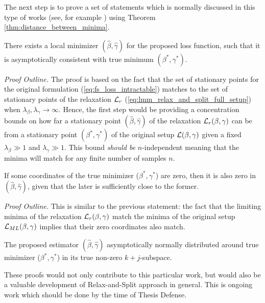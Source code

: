 \documentclass[11pt,letterpaper]{article}
\numberwithin{equation}{section} %
\numberwithin{figure}{section} %
\numberwithin{table}{section} %
\begin{document}
The next step is to prove a set of statements which is normally discussed in this type of works (see, for example \cite{Krishna2008, Hui2017}) using Theorem \ref{thm:distance_between_minima}.

\begin{theorem}
	There exists a local minimizer $(\hat{\beta}, \hat{\gamma})$ for the proposed loss function, such that it is asymptotically consistent with true minimum $(\beta^*, \gamma^*)$. 
\end{theorem}
\textit{Proof Outline.} The proof is based on the fact that the set of stationary points for the original formulation (\ref{eq:fs_loss_intractable}) matches to the set of stationary points of the relaxation $\operatorname{\mathcal{L}}_r$ (\ref{eq:lmm_relax_and_split_full_setup}) when $\lambda_\beta, \lambda_\gamma \to \infty$. Hence, the first step would be providing a concentration bounds on how far a stationary point $(\hat{\beta}, \hat{\gamma})$  of the relaxation $\operatorname{\mathcal{L}}_r(\beta, \gamma)$ can be from a stationary point $(\beta^*, \gamma^*)$ of the original setup $\operatorname{\mathcal{L}}(\beta, \gamma)$ given a fixed $\lambda_\beta \gg 1$ and $\lambda_\gamma \gg 1$. This bound \textit{should be} $n$-independent meaning that the minima will match for any finite number of samples $n$.

\begin{theorem}
	If some coordinates of the true minimizer ($\beta^*, \gamma^*$) are zero, then it is also zero in $(\hat{\beta}, \hat{\gamma})$, given that the later is sufficiently close to the former.
\end{theorem}

\textit{Proof Outline.} This is similar to the previous statement: the fact that the limiting minima of the relaxation $\operatorname{\mathcal{L}}_r(\beta, \gamma)$ match the minima of the original setup $\operatorname{\mathcal{L}}_{ML}(\beta, \gamma)$ implies that their zero coordinates also match.

\begin{theorem}
	The proposed estimator $(\hat{\beta}, \hat{\gamma})$ asymptotically normally distributed around true minimizer ($\beta^*, \gamma^*$) in its true non-zero $k+j$-subspace.
\end{theorem}	

These proofs would not only contribute to this particular work, but would also be a valuable development of Relax-and-Split approach in general. This is ongoing work which should be done by the time of Thesis Defense.
\end{document}

